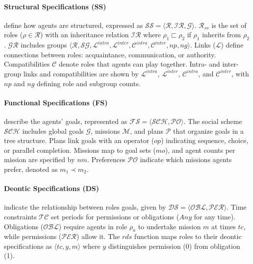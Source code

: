 \documentclass[sigconf]{aamas}
\begin{document}
\noindent \paragraph{\textbf{Structural Specifications (SS)}} define how agents are structured, expressed as $\mathcal{SS} = \langle \mathcal{R}, \mathcal{IR}, \mathcal{G} \rangle$. $\mathcal{R}_{ss}$ is the set of roles ($\rho \in \mathcal{R}$) with an inheritance relation $\mathcal{IR}$ where $\rho_1 \sqsubset \rho_2$ if $\rho_1$ inherits from $\rho_2$. $\mathcal{GR}$ includes groups $\langle \mathcal{R}, \mathcal{SG}, \mathcal{L}^{intra}, \mathcal{L}^{inter}, \allowbreak \mathcal{C}^{intra}, \mathcal{C}^{inter}, np, ng \rangle$. Links ($\mathcal{L}$) define connections between roles: acquaintance, communication, or authority. Compatibilities $\mathcal{C}$ denote roles that agents can play together. Intra- and inter-group links and compatibilities are shown by $\mathcal{L}^{intra}$, $\mathcal{L}^{inter}$, $\mathcal{C}^{intra}$, and $\mathcal{C}^{inter}$, with $np$ and $ng$ defining role and subgroup counts.

\noindent \paragraph{\textbf{Functional Specifications (FS)}} describe the agents' goals, represented as $\mathcal{FS} = \langle \mathcal{SCH}, \mathcal{PO} \rangle$. The social scheme $\mathcal{SCH}$ includes global goals $\mathcal{G}$, missions $\mathcal{M}$, and plans $\mathcal{P}$ that organize goals in a tree structure. Plans link goals with an operator ($op$) indicating sequence, choice, or parallel completion. Missions map to goal sets ($mo$), and agent counts per mission are specified by $nm$. Preferences $\mathcal{PO}$ indicate which missions agents prefer, denoted as $m_1 \prec m_2$.

\noindent \paragraph{\textbf{Deontic Specifications (DS)}} indicate the relationship between roles goals, given by $\mathcal{DS} = \langle \mathcal{OBL}, \mathcal{PER} \rangle$. Time constraints $\mathcal{TC}$ set periods for permissions or obligations ($Any$ for any time). Obligations ($\mathcal{OBL}$) require agents in role $\rho_a$ to undertake mission $m$ at times $tc$, while permissions ($\mathcal{PER}$) allow it. The $rds$ function maps roles to their deontic specifications as $\langle tc, y, m \rangle$ where $y$ distinguishes permission (0) from obligation (1).
\end{document}
